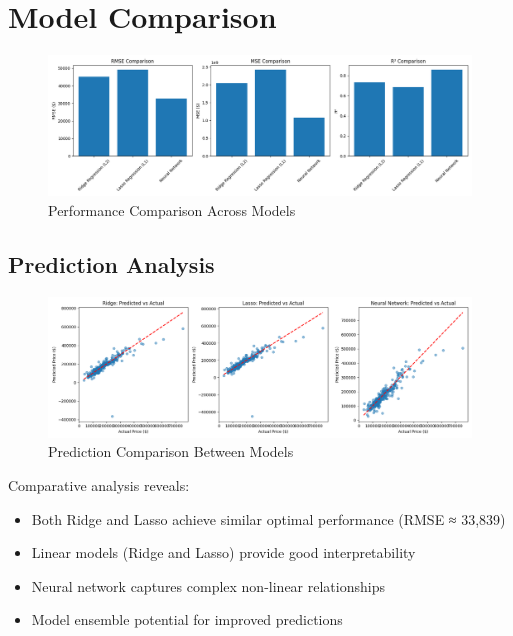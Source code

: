 \documentclass[12pt]{report}
\begin{document}
\section{Model Comparison}
\begin{figure}[H]
    \centering
    \includegraphics[width=1.0\textwidth]{figures/model_comparison.png}
    \caption{Performance Comparison Across Models}
    \label{fig:model_comparison}
\end{figure}

\subsection{Prediction Analysis}
\begin{figure}[H]
    \centering
    \includegraphics[width=1.0\textwidth]{figures/prediction_comparison.png}
    \caption{Prediction Comparison Between Models}
    \label{fig:prediction_comparison}
\end{figure}

Comparative analysis reveals:
\begin{itemize}
    \item Both Ridge and Lasso achieve similar optimal performance (RMSE ≈ 33,839)
    \item Linear models (Ridge and Lasso) provide good interpretability
    \item Neural network captures complex non-linear relationships
    \item Model ensemble potential for improved predictions
\end{itemize}
\end{document}
